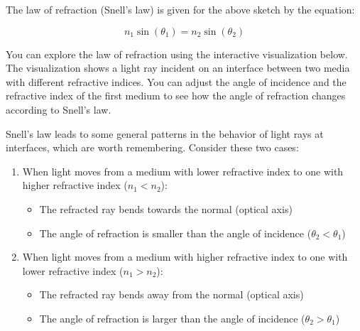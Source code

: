 \documentclass[
  a4paper,
]{book}
\providecommand{\tightlist}{%
  \setlength{\itemsep}{0pt}\setlength{\parskip}{0pt}}
\begin{document}
\begin{tcolorbox}[enhanced jigsaw, coltitle=black, title=\textcolor{quarto-callout-tip-color}{\faLightbulb}\hspace{0.5em}{Law of Refraction (Snell's Law)}, colframe=quarto-callout-tip-color-frame, toprule=.15mm, opacitybacktitle=0.6, left=2mm, opacityback=0, breakable, toptitle=1mm, bottomtitle=1mm, leftrule=.75mm, arc=.35mm, titlerule=0mm, colbacktitle=quarto-callout-tip-color!10!white, rightrule=.15mm, bottomrule=.15mm, colback=white]

The law of refraction (Snell's law) is given for the above sketch by the
equation:

\[
n_1 \sin(\theta_1)=n_2 \sin(\theta_2)
\]

\end{tcolorbox}

You can explore the law of refraction using the interactive
visualization below. The visualization shows a light ray incident on an
interface between two media with different refractive indices. You can
adjust the angle of incidence and the refractive index of the first
medium to see how the angle of refraction changes according to Snell's
law.

Snell's law leads to some general patterns in the behavior of light rays
at interfaces, which are worth remembering. Consider these two cases:

\begin{enumerate}
\def\labelenumi{\arabic{enumi}.}
\tightlist
\item
  When light moves from a medium with lower refractive index to one with
  higher refractive index (\(n_1 < n_2\)):

  \begin{itemize}
  \tightlist
  \item
    The refracted ray bends towards the normal (optical axis)
  \item
    The angle of refraction is smaller than the angle of incidence
    (\(\theta_2 < \theta_1\))
  \end{itemize}
\item
  When light moves from a medium with higher refractive index to one
  with lower refractive index (\(n_1 > n_2\)):

  \begin{itemize}
  \tightlist
  \item
    The refracted ray bends away from the normal (optical axis)
  \item
    The angle of refraction is larger than the angle of incidence
    (\(\theta_2 > \theta_1\))
  \end{itemize}
\end{enumerate}
\end{document}
